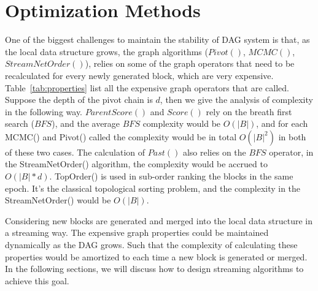 \section{Optimization Methods}
One of the biggest challenges to maintain the stability of DAG system is that, 
as the local data structure grows, the graph algorithms ($Pivot()$, $MCMC()$, $StreamNetOrder()$), 
relies on some of the graph operators that need to be recalculated for every newly generated block,
which are very expensive. 
Table~\ref{tab:properties} list all the expensive graph operators that are called. 
Suppose the depth of the pivot chain is $d$, then we give the analysis of complexity in the following way. 
$ParentScore()$  and $Score()$ rely on the breath first search ($BFS$), and the average $BFS$
complexity would be $O(|B|)$,
and for each MCMC() and Pivot() called 
the complexity would be in total $O(|B|^2)$ in both of these two cases.
The calculation of $Past()$ also relies on the $BFS$ operator, in the StreamNetOrder() algorithm, the complexity would be 
accrued to $O(|B| * d)$.
TopOrder() is used in sub-order ranking the blocks in the same epoch.
It's the classical topological sorting problem, and the complexity in the StreamNetOrder() would be $O(|B|)$.

\begin{table}[]
\caption {Analysis of Graph properties calculation} \label{tab:properties}
\begin{center}
\end{center}
\end{table}

Considering new blocks are generated and merged into the local data structure in a streaming way.
The expensive graph properties could be maintained dynamically as the DAG grows.
Such that the complexity of calculating these properties would be amortized to each time a new block is generated or merged.
In the following sections, we will discuss how to design streaming algorithms to achieve this goal.

